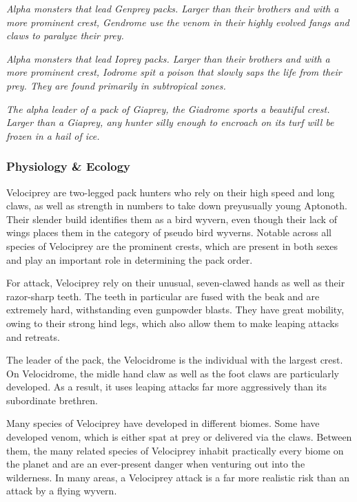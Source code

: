 \textit{Alpha monsters that lead Genprey packs. Larger than their brothers and with a more prominent crest, Gendrome use the venom in their highly evolved fangs and claws to paralyze their prey.}%

\textit{Alpha monsters that lead Ioprey packs. Larger than their brothers and with a more prominent crest, Iodrome spit a poison that slowly saps the life from their prey. They are found primarily in subtropical zones.}\par{}%

\textit{The alpha leader of a pack of Giaprey, the Giadrome sports a beautiful crest. Larger than a Giaprey, any hunter silly enough to encroach on its turf will be frozen in a hail of ice.}%

\subsubsection{Physiology \& Ecology}
Velociprey are two-legged pack hunters who rely on their high speed and long claws, as well as strength in numbers to take down prey\hbNone usually young Aptonoth. Their slender build identifies them as a bird wyvern, even though their lack of wings places them in the category of pseudo bird wyverns. Notable across all species of Velociprey are the prominent crests, which are present in both sexes and play an important role in determining the pack order.

For attack, Velociprey rely on their unusual, seven-clawed hands as well as their razor-sharp teeth. The teeth in particular are fused with the beak and are extremely hard, withstanding even gunpowder blasts. They have great mobility, owing to their strong hind legs, which also allow them to make leaping attacks and retreats.

The leader of the pack, the Velocidrome is the individual with the largest crest. On Velocidrome, the midle hand claw as well as the foot claws are particularly developed. As a result, it uses leaping attacks far more aggressively than its subordinate brethren.

Many species of Velociprey have developed in different biomes. Some have developed venom, which is either spat at prey or delivered via the claws. Between them, the many related species of Velociprey inhabit practically every biome on the planet and are an ever-present danger when venturing out into the wilderness. In many areas, a Velociprey attack is a far more realistic risk than an attack by a flying wyvern.

